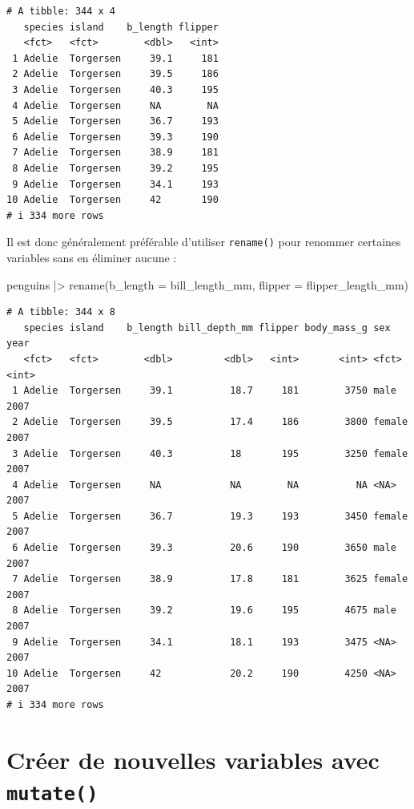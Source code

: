 \documentclass[
  a4paper,
  DIV=11,
  numbers=noendperiod,
  oneside]{scrreprt}
\newenvironment{Shaded}{}{}
\newcommand{\AttributeTok}[1]{\textcolor[rgb]{0.84,0.23,0.29}{#1}}
\newcommand{\FunctionTok}[1]{\textcolor[rgb]{0.44,0.26,0.76}{#1}}
\newcommand{\NormalTok}[1]{\textcolor[rgb]{0.14,0.16,0.18}{#1}}
\newcommand{\SpecialCharTok}[1]{\textcolor[rgb]{0.00,0.36,0.77}{#1}}
\begin{document}
\begin{verbatim}
# A tibble: 344 x 4
   species island    b_length flipper
   <fct>   <fct>        <dbl>   <int>
 1 Adelie  Torgersen     39.1     181
 2 Adelie  Torgersen     39.5     186
 3 Adelie  Torgersen     40.3     195
 4 Adelie  Torgersen     NA        NA
 5 Adelie  Torgersen     36.7     193
 6 Adelie  Torgersen     39.3     190
 7 Adelie  Torgersen     38.9     181
 8 Adelie  Torgersen     39.2     195
 9 Adelie  Torgersen     34.1     193
10 Adelie  Torgersen     42       190
# i 334 more rows
\end{verbatim}

Il est donc généralement préférable d'utiliser \texttt{rename()} pour
renommer certaines variables sans en éliminer aucune :

\begin{Shaded}
\begin{Highlighting}[]
\NormalTok{penguins }\SpecialCharTok{|\textgreater{}}
  \FunctionTok{rename}\NormalTok{(}\AttributeTok{b\_length =}\NormalTok{ bill\_length\_mm,}
         \AttributeTok{flipper =}\NormalTok{ flipper\_length\_mm)}
\end{Highlighting}
\end{Shaded}

\begin{verbatim}
# A tibble: 344 x 8
   species island    b_length bill_depth_mm flipper body_mass_g sex     year
   <fct>   <fct>        <dbl>         <dbl>   <int>       <int> <fct>  <int>
 1 Adelie  Torgersen     39.1          18.7     181        3750 male    2007
 2 Adelie  Torgersen     39.5          17.4     186        3800 female  2007
 3 Adelie  Torgersen     40.3          18       195        3250 female  2007
 4 Adelie  Torgersen     NA            NA        NA          NA <NA>    2007
 5 Adelie  Torgersen     36.7          19.3     193        3450 female  2007
 6 Adelie  Torgersen     39.3          20.6     190        3650 male    2007
 7 Adelie  Torgersen     38.9          17.8     181        3625 female  2007
 8 Adelie  Torgersen     39.2          19.6     195        4675 male    2007
 9 Adelie  Torgersen     34.1          18.1     193        3475 <NA>    2007
10 Adelie  Torgersen     42            20.2     190        4250 <NA>    2007
# i 334 more rows
\end{verbatim}

\section{\texorpdfstring{Créer de nouvelles variables avec
\texttt{mutate()}}{Créer de nouvelles variables avec mutate()}}\label{mutate}
\end{document}
